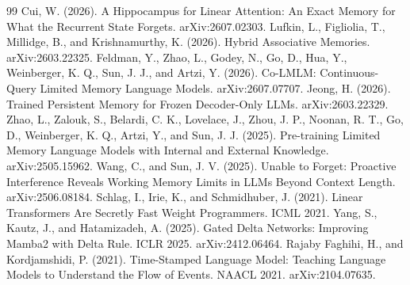 \documentclass[11pt,a4paper]{article}
\begin{document}
\begin{thebibliography}{99}
 Cui, W. (2026). A Hippocampus for Linear Attention: An Exact Memory for What the Recurrent State Forgets. arXiv:2607.02303.
 Lufkin, L., Figliolia, T., Millidge, B., and Krishnamurthy, K. (2026). Hybrid Associative Memories. arXiv:2603.22325.
 Feldman, Y., Zhao, L., Godey, N., Go, D., Hua, Y., Weinberger, K. Q., Sun, J. J., and Artzi, Y. (2026). Co-LMLM: Continuous-Query Limited Memory Language Models. arXiv:2607.07707.
 Jeong, H. (2026). Trained Persistent Memory for Frozen Decoder-Only LLMs. arXiv:2603.22329.
 Zhao, L., Zalouk, S., Belardi, C. K., Lovelace, J., Zhou, J. P., Noonan, R. T., Go, D., Weinberger, K. Q., Artzi, Y., and Sun, J. J. (2025). Pre-training Limited Memory Language Models with Internal and External Knowledge. arXiv:2505.15962.
 Wang, C., and Sun, J. V. (2025). Unable to Forget: Proactive Interference Reveals Working Memory Limits in LLMs Beyond Context Length. arXiv:2506.08184.
 Schlag, I., Irie, K., and Schmidhuber, J. (2021). Linear Transformers Are Secretly Fast Weight Programmers. ICML 2021.
 Yang, S., Kautz, J., and Hatamizadeh, A. (2025). Gated Delta Networks: Improving Mamba2 with Delta Rule. ICLR 2025. arXiv:2412.06464.
 Rajaby Faghihi, H., and Kordjamshidi, P. (2021). Time-Stamped Language Model: Teaching Language Models to Understand the Flow of Events. NAACL 2021. arXiv:2104.07635.
\end{thebibliography}
\end{document}
